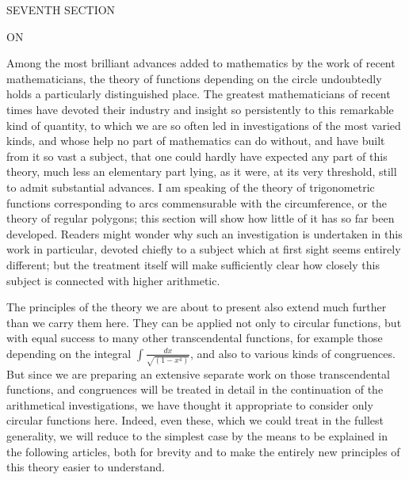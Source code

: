 

\begin{center}{\Large SEVENTH SECTION}\par\medskip ON\par{}\end{center}

Among the most brilliant advances added to mathematics by the work of recent mathematicians, the theory of functions depending on the circle undoubtedly holds a particularly distinguished place. The greatest mathematicians of recent times have devoted their industry and insight so persistently to this remarkable kind of quantity, to which we are so often led in investigations of the most varied kinds, and whose help no part of mathematics can do without, and have built from it so vast a subject, that one could hardly have expected any part of this theory, much less an elementary part lying, as it were, at its very threshold, still to admit substantial advances. I am speaking of the theory of trigonometric functions corresponding to arcs commensurable with the circumference, or the theory of regular polygons; this section will show how little of it has so far been developed. Readers might wonder why such an investigation is undertaken in this work in particular, devoted chiefly to a subject which at first sight seems entirely different; but the treatment itself will make sufficiently clear how closely this subject is connected with higher arithmetic.

The principles of the theory we are about to present also extend much further than we carry them here. They can be applied not only to circular functions, but with equal
success to many other transcendental functions, for example those depending on the integral \(\int\frac{dx}{\surd{(1-x^4)}}\), and also to various kinds of congruences. But since we are preparing an extensive separate work on those transcendental functions, and congruences will be treated in detail in the continuation of the arithmetical investigations, we have thought it appropriate to consider only circular functions here. Indeed, even these, which we could treat in the fullest generality, we will reduce to the simplest case by the means to be explained in the following articles, both for brevity and to make the entirely new principles of this theory easier to understand.

